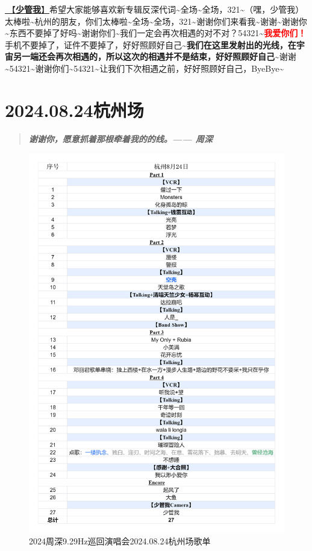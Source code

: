 \documentclass[]{ctexbook}
\begin{document}
\hyperref[watch-ur-manners]{🎵【\textbf{少管我}】}希望大家能够喜欢新专辑反深代词\textasciitilde 全场\textasciitilde 全场，321\textasciitilde（嘿，少管我）太棒啦\textasciitilde 杭州的朋友，你们太棒啦\textasciitilde 全场\textasciitilde 全场，321\textasciitilde 谢谢你们来看我\textasciitilde 谢谢\textasciitilde 谢谢你\textasciitilde 东西不要掉了好吗\textasciitilde 谢谢你们\textasciitilde 我们一定会再次相遇的对不对？54321\textasciitilde{}\textbf{\textcolor{red}{我爱你们！}}手机不要掉了，证件不要掉了，好好照顾好自己\textasciitilde{}\textbf{我们在这里发射出的光线，在宇宙另一端还会再次相遇的，所以这次的相遇并不是结束，好好照顾好自己\textasciitilde{}}谢谢\textasciitilde54321\textasciitilde 谢谢你们\textasciitilde54321\textasciitilde 让我们下次相遇之前，好好照顾好自己，ByeBye\textasciitilde{}

\chapter{2024.08.24杭州场}\label{hangzhou-20240824}

\begin{quote}
\textbf{\emph{谢谢你，愿意抓着那根牵着我的的线。------ 周深}}
\end{quote}

\begin{figure}

{\centering \includegraphics[width=320pt]{img/playlists/playlists-hangzhou-20240824} 

}

\caption{2024周深9.29Hz巡回演唱会2024.08.24杭州场歌单}\label{fig:unnamed-chunk-86}
\end{figure}
\end{document}
